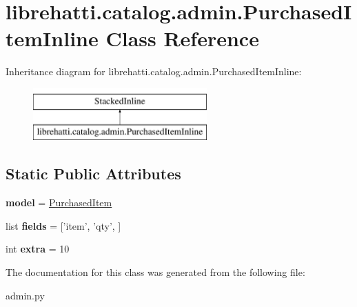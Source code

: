 \hypertarget{classlibrehatti_1_1catalog_1_1admin_1_1PurchasedItemInline}{\section{librehatti.\-catalog.\-admin.\-Purchased\-Item\-Inline Class Reference}
\label{classlibrehatti_1_1catalog_1_1admin_1_1PurchasedItemInline}
}
Inheritance diagram for librehatti.\-catalog.\-admin.\-Purchased\-Item\-Inline\-:\begin{figure}[H]
\begin{center}
\leavevmode
\includegraphics[height=2.000000cm]{classlibrehatti_1_1catalog_1_1admin_1_1PurchasedItemInline}
\end{center}
\end{figure}
\subsection*{Static Public Attributes}
\begin{DoxyCompactItemize}
\item 
\hypertarget{classlibrehatti_1_1catalog_1_1admin_1_1PurchasedItemInline_a7c61aeec8b94ca50e53c9c341ad8fca8}{{\bfseries model} = \hyperlink{classlibrehatti_1_1catalog_1_1models_1_1PurchasedItem}{Purchased\-Item}}\label{classlibrehatti_1_1catalog_1_1admin_1_1PurchasedItemInline_a7c61aeec8b94ca50e53c9c341ad8fca8}

\item 
\hypertarget{classlibrehatti_1_1catalog_1_1admin_1_1PurchasedItemInline_a05deeded81a6a9daab5823eccce84df5}{list {\bfseries fields} = \mbox{[}'item', 'qty', \mbox{]}}\label{classlibrehatti_1_1catalog_1_1admin_1_1PurchasedItemInline_a05deeded81a6a9daab5823eccce84df5}

\item 
\hypertarget{classlibrehatti_1_1catalog_1_1admin_1_1PurchasedItemInline_ae7c4b7ddbc9841c10fc7aa7ae8a5c6c0}{int {\bfseries extra} = 10}\label{classlibrehatti_1_1catalog_1_1admin_1_1PurchasedItemInline_ae7c4b7ddbc9841c10fc7aa7ae8a5c6c0}

\end{DoxyCompactItemize}


The documentation for this class was generated from the following file\-:\begin{DoxyCompactItemize}
\item 
admin.\-py\end{DoxyCompactItemize}
